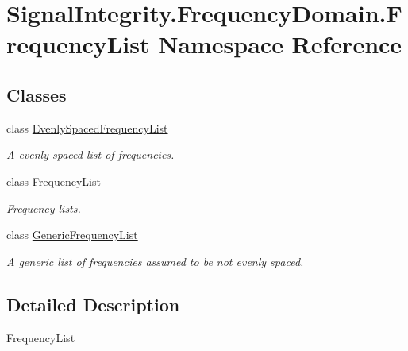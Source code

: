 \hypertarget{namespaceSignalIntegrity_1_1FrequencyDomain_1_1FrequencyList}{}\section{Signal\+Integrity.\+Frequency\+Domain.\+Frequency\+List Namespace Reference}
\label{namespaceSignalIntegrity_1_1FrequencyDomain_1_1FrequencyList}
\subsection*{Classes}
\begin{DoxyCompactItemize}
\item 
class \hyperlink{classSignalIntegrity_1_1FrequencyDomain_1_1FrequencyList_1_1EvenlySpacedFrequencyList}{Evenly\+Spaced\+Frequency\+List}
\begin{DoxyCompactList}\small\item\em A evenly spaced list of frequencies. \end{DoxyCompactList}\item 
class \hyperlink{classSignalIntegrity_1_1FrequencyDomain_1_1FrequencyList_1_1FrequencyList}{Frequency\+List}
\begin{DoxyCompactList}\small\item\em Frequency lists. \end{DoxyCompactList}\item 
class \hyperlink{classSignalIntegrity_1_1FrequencyDomain_1_1FrequencyList_1_1GenericFrequencyList}{Generic\+Frequency\+List}
\begin{DoxyCompactList}\small\item\em A generic list of frequencies assumed to be not evenly spaced. \end{DoxyCompactList}\end{DoxyCompactItemize}


\subsection{Detailed Description}
\begin{DoxyVerb}FrequencyList\end{DoxyVerb}
 